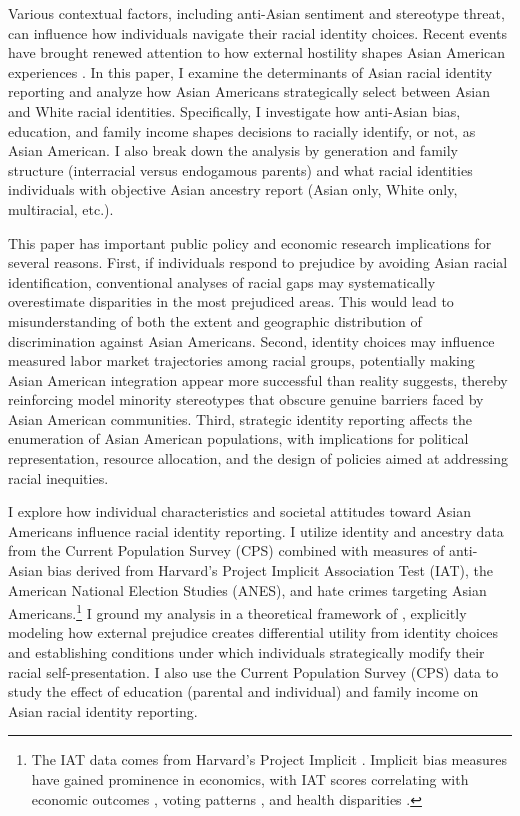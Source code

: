 Various contextual factors, including anti-Asian sentiment and stereotype threat, can influence how individuals navigate their racial identity choices. Recent events have brought renewed attention to how external hostility shapes Asian American experiences \autocite{gover2020anti}. In this paper, I examine the determinants of Asian racial identity reporting and analyze how Asian Americans strategically select between Asian and White racial identities. Specifically, I investigate how anti-Asian bias, education, and family income shapes decisions to racially identify, or not, as Asian American. I also break down the analysis by generation and family structure (interracial versus endogamous parents) and what racial identities individuals with objective Asian ancestry report (Asian only, White only, multiracial, etc.).

This paper has important public policy and economic research implications for several reasons. First, if individuals respond to prejudice by avoiding Asian racial identification, conventional analyses of racial gaps may systematically overestimate disparities in the most prejudiced areas. This would lead to misunderstanding of both the extent and geographic distribution of discrimination against Asian Americans. Second, identity choices may influence measured labor market trajectories among racial groups, potentially making Asian American integration appear more successful than reality suggests, thereby reinforcing model minority stereotypes that obscure genuine barriers faced by Asian American communities. Third, strategic identity reporting affects the enumeration of Asian American populations, with implications for political representation, resource allocation, and the design of policies aimed at addressing racial inequities.

I explore how individual characteristics and societal attitudes toward Asian Americans influence racial identity reporting. I utilize identity and ancestry data from the Current Population Survey (CPS) combined with measures of anti-Asian bias derived from Harvard's Project Implicit Association Test (IAT), the American National Election Studies (ANES), and hate crimes targeting Asian Americans.\footnote{The IAT data comes from Harvard's Project Implicit \autocite{greenwaldMeasuringIndividualDifferences1998}. Implicit bias measures have gained prominence in economics, with IAT scores correlating with economic outcomes \autocite{chettyRaceEconomicOpportunity2020,gloverDiscriminationSelfFulfillingProphecy2017}, voting patterns \autocite{friesePredictingVotingBehavior2007}, and health disparities \autocite{leitnerRacialBiasAssociated2016}.} I ground my analysis in a theoretical framework of \textcite{akerlofEconomicsIdentity2000}, explicitly modeling how external prejudice creates differential utility from identity choices and establishing conditions under which individuals strategically modify their racial self-presentation. I also use the Current Population Survey (CPS) data to study the effect of education (parental and individual) and family income on Asian racial identity reporting.

